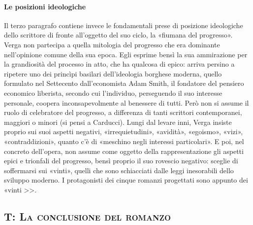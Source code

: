\documentclass{book}
\newcounter{mar}
\begin{document}
\paragraph{Le posizioni ideologiche} Il terzo paragrafo contiene invece le fondamentali prese di posizione ideologiche dello scrittore di fronte all'oggetto del suo ciclo, la «fiumana del progresso». Verga non partecipa a quella mitologia del progresso che era dominante nell'opinione comune della sua epoca. Egli esprime bensì la sua ammirazione per la grandiosità del processo in atto, che ha qualcosa di epico: arriva persino a ripetere uno dei princìpi basilari dell'ideologia borghese moderna, quello formulato nel Settecento dall'economista Adam Smith, il fondatore del pensiero economico liberista, secondo cui l'individuo, perseguendo il suo interesse personale, coopera inconsapevolmente al benessere di tutti. Però non si assume il ruolo di celebratore del progresso, a differenza di tanti scrittori contemporanei, maggiori o minori (si pensi a Carducci).
Lungi dal levare inni, Verga insiste proprio sui suoi aspetti negativi, «irrequietudini», «avidità», «egoismo», «vizi», «contraddizioni», quanto c'è di «meschino negli interessi particolari». E poi, nel concreto dell'opera, non assume come oggetto della rappresentazione gli aspetti epici e trionfali del progresso, bensì proprio il suo rovescio negativo: sceglie di soffermarsi sui «vinti», quelli che sono schiacciati dalle leggi inesorabili dello sviluppo moderno. I protagonisti dei cinque romanzi progettati sono appunto dei «vinti >>.

\subsection{T: \textsc{La conclusione del romanzo}}
\end{document}
